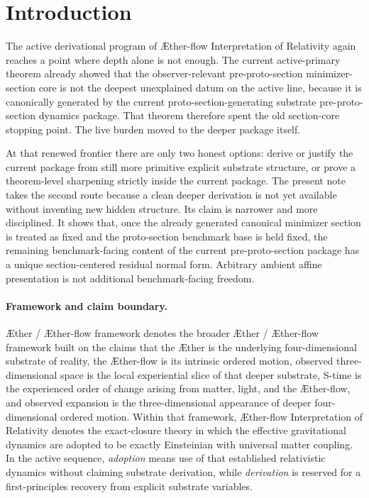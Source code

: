 \documentclass[11pt]{article}
\newcommand{\Aether}{\AE{}ther}
\newcommand{\Aflow}{\AE{}ther-flow}
\newcommand{\TheoryName}{\Aflow{} Interpretation of Relativity}
\newcommand{\TheoryProgram}{\Aether{} / \Aflow{} framework}
\begin{document}
\section{Introduction}

The active derivational program of \TheoryName{} again reaches a point where depth alone is not enough. The current active-primary theorem already showed that the observer-relevant pre-proto-section minimizer-section core is not the deepest unexplained datum on the active line, because it is canonically generated by the current proto-section-generating substrate pre-proto-section dynamics package. That theorem therefore spent the old section-core stopping point. The live burden moved to the deeper package itself.

At that renewed frontier there are only two honest options: derive or justify the current package from still more primitive explicit substrate structure, or prove a theorem-level sharpening strictly inside the current package. The present note takes the second route because a clean deeper derivation is not yet available without inventing new hidden structure. Its claim is narrower and more disciplined. It shows that, once the already generated canonical minimizer section is treated as fixed and the proto-section benchmark base is held fixed, the remaining benchmark-facing content of the current pre-proto-section package has a unique section-centered residual normal form. Arbitrary ambient affine presentation is not additional benchmark-facing freedom.

\paragraph{Framework and claim boundary.}
\TheoryProgram{} denotes the broader \Aether{} / \Aflow{} framework built on the claims that the \Aether{} is the underlying four-dimensional substrate of reality, the \Aflow{} is its intrinsic ordered motion, observed three-dimensional space is the local experiential slice of that deeper substrate, S-time is the experienced order of change arising from matter, light, and the \Aflow{}, and observed expansion is the three-dimensional appearance of deeper four-dimensional ordered motion. Within that framework, \TheoryName{} denotes the exact-closure theory in which the effective gravitational dynamics are adopted to be exactly Einsteinian with universal matter coupling. In the active sequence, \emph{adoption} means use of that established relativistic dynamics without claiming substrate derivation, while \emph{derivation} is reserved for a first-principles recovery from explicit substrate variables.
\end{document}
